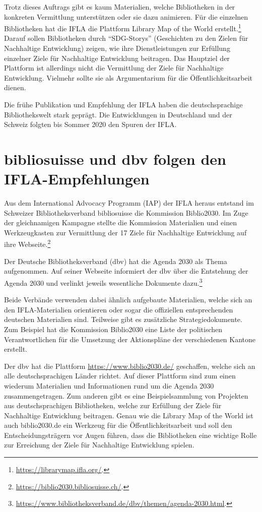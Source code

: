 \documentclass[a4paper,
fontsize=11pt,
oneside,
numbers=noperiodatend,
parskip=half-,
bibliography=totoc,
final
]{scrartcl}
\begin{document}
Trotz dieses Auftrags gibt es kaum Materialien, welche Bibliotheken in
der konkreten Vermittlung unterstützen oder sie dazu animieren. Für die
einzelnen Bibliotheken hat die IFLA die Plattform Library Map of the
World erstellt.\footnote{\url{https://librarymap.ifla.org/}.} Darauf
sollen Bibliotheken durch \enquote{SDG-Storys} (Geschichten zu den
Zielen für Nachhaltige Entwicklung) zeigen, wie ihre Dienstleistungen
zur Erfüllung einzelner Ziele für Nachhaltige Entwicklung beitragen. Das
Hauptziel der Plattform ist allerdings nicht die Vermittlung der Ziele
für Nachhaltige Entwicklung. Vielmehr sollte sie als Argumentarium für
die Öffentlichkeitsarbeit dienen.

Die frühe Publikation und Empfehlung der IFLA haben die deutschsprachige
Bibliothekswelt stark geprägt. Die Entwicklungen in Deutschland und der
Schweiz folgten bis Sommer 2020 den Spuren der IFLA.

\hypertarget{bibliosuisse-und-dbv-folgen-den-ifla-empfehlungen}{%
\section{bibliosuisse und dbv folgen den
IFLA-Empfehlungen}\label{bibliosuisse-und-dbv-folgen-den-ifla-empfehlungen}}

Aus dem International Advocacy Programm (IAP) der IFLA heraus entstand
im Schweizer Bibliotheksverband bibliosuisse die Kommission Biblio2030.
Im Zuge der gleichnamigen Kampagne stellte die Kommission Materialien
und einen Werkzeugkasten zur Vermittlung der 17 Ziele für Nachhaltige
Entwicklung auf ihre Webseite.\footnote{\url{https://biblio2030.bibliosuisse.ch/}.}

Der Deutsche Bibliotheksverband (dbv) hat die Agenda 2030 als Thema
aufgenommen. Auf seiner Webseite informiert der dbv über die Entstehung
der Agenda 2030 und verlinkt jeweils wesentliche Dokumente
dazu.\footnote{\url{https://www.bibliotheksverband.de/dbv/themen/agenda-2030.html}.}

Beide Verbände verwenden dabei ähnlich aufgebaute Materialien, welche
sich an den IFLA-Materialien orientieren oder sogar die offiziellen
entsprechenden deutschen Materialien sind. Teilweise gibt es zusätzliche
Strategiedokumente. Zum Beispiel hat die Kommission Biblio2030 eine
Liste der politischen Verantwortlichen für die Umsetzung der
Aktionspläne der verschiedenen Kantone erstellt.

Der dbv hat die Plattform \url{https://www.biblio2030.de/} geschaffen,
welche sich an alle deutschsprachigen Länder richtet. Auf dieser
Plattform sind zum einen wiederum Materialien und Informationen rund um
die Agenda 2030 zusammengetragen. Zum anderen gibt es eine
Beispielsammlung von Projekten aus deutschsprachigen Bibliotheken,
welche zur Erfüllung der Ziele für Nachhaltige Entwicklung beitragen.
Genau wie die Library Map of the World ist auch biblio2030.de ein
Werkzeug für die Öffentlichkeitsarbeit und soll den Entscheidungsträgern
vor Augen führen, dass die Bibliotheken eine wichtige Rolle zur
Erreichung der Ziele für Nachhaltige Entwicklung spielen.
\end{document}
